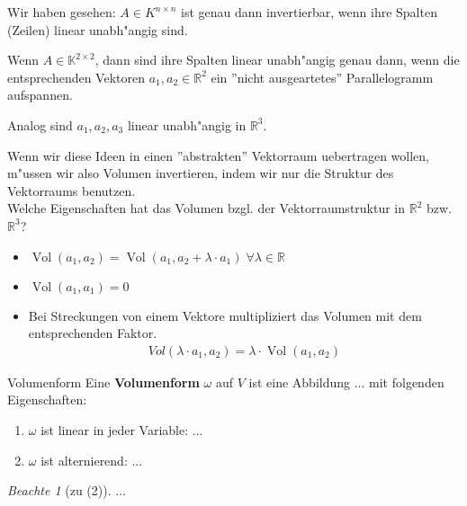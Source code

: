 \documentclass[11pt]{article}
\DeclareMathOperator{\mVol}{Vol}
\theoremstyle{remark}
\newtheorem*{notte}{Beachte}
\theoremstyle{definition}
\theoremstyle{remark}
\begin{document}
\begin{relation}
\begin{trivlist}
  \item Wir haben gesehen: $A\in K^{n\times n}$ ist genau dann invertierbar, wenn ihre Spalten
  (Zeilen) linear unabh"angig sind.
 
  \item  Wenn $A\in \mathbb{K}^{2\times 2}$, dann sind ihre
  Spalten linear unabh"angig genau dann, wenn die entsprechenden Vektoren $a_1,
  a_2 \in \mathbb{R}^2$ ein ''nicht ausgeartetes'' Parallelogramm aufspannen. \\

  \item Analog sind $a_1, a_2, a_3$ linear unabh"angig in $\mathbb{R}^3$.
\end{trivlist}
\end{relation}

Wenn wir diese Ideen in einen ''abstrakten'' Vektorraum uebertragen wollen,
m"ussen wir also Volumen invertieren, indem wir nur die Struktur des
Vektorraums benutzen.\\

Welche Eigenschaften hat das Volumen bzgl. der Vektorraumstruktur in
$\mathbb{R}^2$ bzw. $\mathbb{R}^3$?
\begin{itemize}
\item $\mVol(a_1,a_2)=\mVol(a_1, a_2 + \lambda \cdot a_1)\; \forall \lambda \in
  \mathbb{R}$
\item $\mVol(a_1,a_1)=0$
\item Bei Streckungen von einem Vektore multipliziert das Volumen mit dem
  entsprechenden Faktor.
  \begin{align*}
    Vol(\lambda\cdot a_1, a_2)=\lambda\cdot \mVol(a_1,a_2) \tag{$\lambda \geq 0$}
    \end{align*}
\end{itemize}

\begin{definition}{Volumenform}
  Eine \textbf{Volumenform} $\omega$ auf $V$ ist eine Abbildung ... mit
  folgenden Eigenschaften:
  \begin{enumerate}
  \item $\omega$ ist linear in jeder Variable: ...
  \item $\omega$ ist alternierend: ...
  \end{enumerate}
\end{definition}

\begin{notte}[zu (2)]
  ...
\end{notte}
\end{document}
